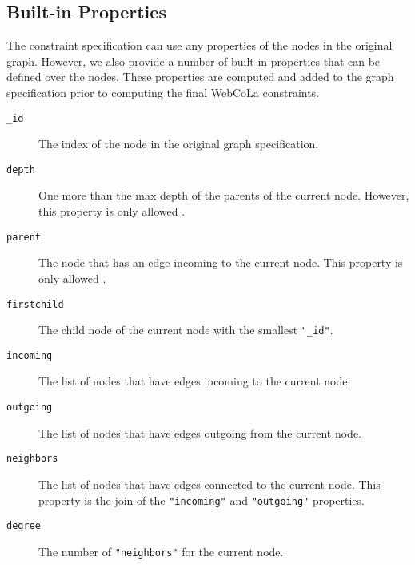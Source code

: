 \subsection{Built-in Properties}
The constraint specification can use any properties of the nodes in the original graph. However, we also provide a number of built-in properties that can be defined over the nodes. These properties are computed and added to the graph specification prior to computing the final WebCoLa constraints. 

\begin{description}
\item[\texttt{\_id}] The index of the node in the original graph specification.
\item[\texttt{depth}] One more than the max depth of the parents of the current node. However, this property is only allowed .
\item[\texttt{parent}] The node that has an edge incoming to the current node. This property is only allowed .
\item[\texttt{firstchild}] The child node of the current node with the smallest \texttt{"\_id"}.
\item[\texttt{incoming}] The list of nodes that have edges incoming to the current node. 
\item[\texttt{outgoing}] The list of nodes that have edges outgoing from the current node. 
\item[\texttt{neighbors}] The list of nodes that have edges connected to the current node. This property is the join of the \texttt{"incoming"} and \texttt{"outgoing"} properties.
\item[\texttt{degree}] The number of \texttt{"neighbors"} for the current node.
\end{description}
